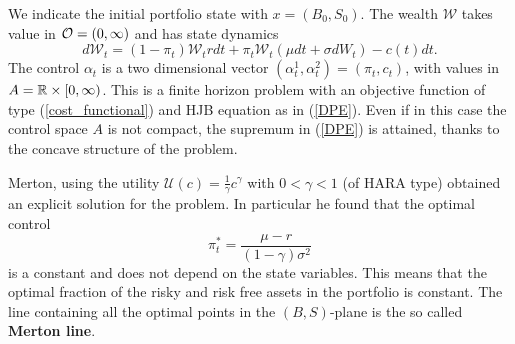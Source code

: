 We indicate the initial portfolio state with $x = (B_0,S_0)$. 
The wealth $\mathcal{W}$ takes value in $\mathcal{O} = (0,\infty)$ and has state dynamics
\begin{equation}
 d \mathcal{W}_t = (1-\pi_t) \mathcal{W}_t r dt + \pi_t \mathcal{W}_t (\mu dt + \sigma dW_t) - c(t)dt.
\end{equation}
The control $\alpha_t$ is a two dimensional vector $(\alpha^1_t,\alpha^2_t) = (\pi_t,c_t)$, with values in $A = \mathbb{R} \times [0,\infty)$. 
This is a finite horizon problem with an objective function of type (\ref{cost_functional})
and HJB equation as in (\ref{DPE}). 
Even if in this case the control space $A$ is not compact, the supremum in (\ref{DPE}) is attained, thanks to the concave structure of the problem.

Merton, using the utility $\mathcal{U}(c) = \frac{1}{\gamma} c^{\gamma}$ with $0<\gamma<1$ (of HARA type) obtained an explicit solution for the problem. In particular he found that 
the optimal control
\begin{equation}\label{Merton_policy}
  \pi^*_t = \frac{\mu-r}{(1-\gamma)\sigma^2}
\end{equation}
is a constant and does not depend on the state variables.  
This means that the optimal fraction of the risky and risk free assets in the portfolio is constant.
The line containing all the optimal points in the $(B,S)$-plane is the so called \textbf{Merton line}.



